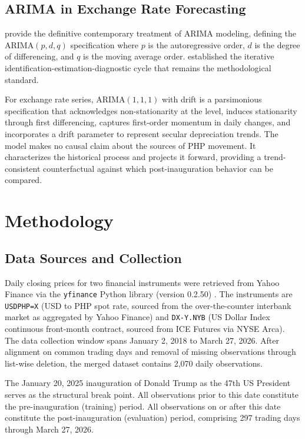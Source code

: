 \documentclass[12pt]{article}
\begin{document}
\subsection{ARIMA in Exchange Rate Forecasting}

\citet{hyndman2021} provide the definitive contemporary treatment of ARIMA modeling,
defining the ARIMA$(p,d,q)$ specification where $p$ is the autoregressive order, $d$ is the degree of differencing, and $q$ is the moving average order. \citet{box2015} established the iterative identification-estimation-diagnostic cycle that remains the methodological standard.

For exchange rate series, ARIMA$(1,1,1)$ with drift is a parsimonious specification
that acknowledges non-stationarity at the level, induces stationarity through first
differencing, captures first-order momentum in daily changes, and incorporates a drift
parameter to represent secular depreciation trends. The model makes no causal claim
about the sources of PHP movement. It characterizes the historical process and projects
it forward, providing a trend-consistent counterfactual against which post-inauguration
behavior can be compared.

\section{Methodology}

\subsection{Data Sources and Collection}

Daily closing prices for two financial instruments were retrieved from Yahoo Finance
via the \texttt{yfinance} Python library (version 0.2.50) \citep{yahoophp2026,
yahoodxy2026}. The instruments are \texttt{USDPHP=X} (USD to PHP spot rate, sourced
from the over-the-counter interbank market as aggregated by Yahoo Finance) and
\texttt{DX-Y.NYB} (US Dollar Index continuous front-month contract, sourced from
ICE Futures via NYSE Arca). The data collection window spans January 2, 2018 to
March 27, 2026. After alignment on common trading days and removal of missing
observations through list-wise deletion, the merged dataset contains 2,070 daily
observations.

The January 20, 2025 inauguration of Donald Trump as the 47th US President
serves as the structural break point. All observations prior to this date constitute
the pre-inauguration (training) period. All observations on or after this date
constitute the post-inauguration (evaluation) period, comprising 297 trading days
through March 27, 2026.
\end{document}
